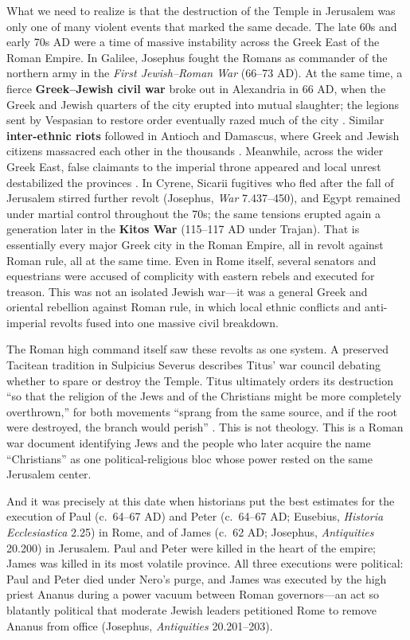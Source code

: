 What we need to realize is that the destruction of the Temple in Jerusalem was only one of many violent events that marked the same decade.
The late 60s and early 70s AD were a time of massive instability across the Greek East of the Roman Empire.
In Galilee, Josephus fought the Romans as commander of the northern army in the \textit{First Jewish--Roman War} (66--73 AD).
At the same time, a fierce \textbf{Greek--Jewish civil war} broke out in Alexandria in 66 AD, when the Greek and Jewish quarters of the city erupted into mutual slaughter; the legions sent by Vespasian to restore order eventually razed much of the city \cite[2.497--507]{josephus:war}.
Similar \textbf{inter-ethnic riots} followed in Antioch and Damascus, where Greek and Jewish citizens massacred each other in the thousands \cite[7.43--45]{josephus:war}.
Meanwhile, across the wider Greek East, false claimants to the imperial throne appeared and local unrest destabilized the provinces \cite[2.8--9]{tacitus:histories}.
In Cyrene, Sicarii fugitives who fled after the fall of Jerusalem stirred further revolt (Josephus, \emph{War} 7.437--450), and Egypt remained under martial control throughout the 70s; the same tensions erupted again a generation later in the \textbf{Kitos War} (115--117 AD under Trajan).
That is essentially every major Greek city in the Roman Empire, all in revolt against Roman rule, all at the same time.
Even in Rome itself, several senators and equestrians were accused of complicity with eastern rebels and executed for treason.
This was not an isolated Jewish war---it was a general Greek and oriental rebellion against Roman rule, in which local ethnic conflicts and anti-imperial revolts fused into one massive civil breakdown.

The Roman high command itself saw these revolts as one system.
A preserved Tacitean tradition in Sulpicius Severus describes Titus' war council debating whether to spare or destroy the Temple.
Titus ultimately orders its destruction ``so that the religion of the Jews and of the Christians might be more completely overthrown,'' for both movements ``sprang from the same source, and if the root were destroyed, the branch would perish'' \cite[2.30.6--7]{sulpicius:chronica}.
This is not theology.
This is a Roman war document identifying Jews and the people who later acquire the name ``Christians'' as one political-religious bloc whose power rested on the same Jerusalem center.

And it was precisely at this date when historians put the best estimates for the execution of Paul (c.~64--67 AD) and Peter (c.~64--67 AD; Eusebius, \emph{Historia Ecclesiastica} 2.25) in Rome, and of James (c.~62 AD; Josephus, \emph{Antiquities} 20.200) in Jerusalem.
Paul and Peter were killed in the heart of the empire; James was killed in its most volatile province.
All three executions were political: Paul and Peter died under Nero's purge, and James was executed by the high priest Ananus during a power vacuum between Roman governors---an act so blatantly political that moderate Jewish leaders petitioned Rome to remove Ananus from office (Josephus, \emph{Antiquities} 20.201--203).

